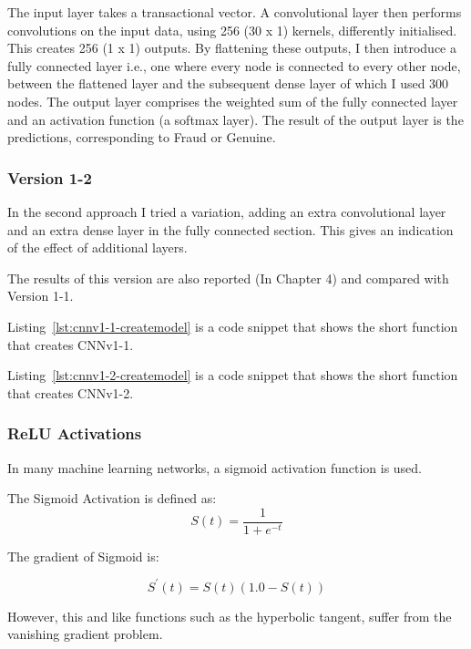\documentclass[12pt,a4paper,twoside]{report}
\begin{document}
The input layer takes a transactional vector. A convolutional layer then performs convolutions on the input data, using 256 (30 x 1) kernels, differently initialised. This creates 256 (1 x 1) outputs. By flattening these outputs, I then introduce a fully connected layer i.e., one where every node is connected to every other node, between the flattened layer and the subsequent dense layer of which I used 300 nodes. The output layer comprises the weighted sum of the fully connected layer and an activation function (a softmax layer). The result of the output layer is the predictions, corresponding to Fraud or Genuine.

\subsubsection{Version 1-2}
In the second approach I tried a variation, adding an extra convolutional layer and an extra dense layer in the fully connected section. This gives an indication of the effect of additional layers.

The results of this version are also reported (In Chapter 4) and compared with Version 1-1. 

Listing~\ref{lst:cnnv1-1-createmodel} is a code snippet that shows the short function that creates CNNv1-1. 



Listing~\ref{lst:cnnv1-2-createmodel} is a code snippet that shows the short function that creates CNNv1-2. 





\subsubsection{ReLU Activations}

In many machine learning networks, a sigmoid activation function is used. 

The Sigmoid Activation is defined as:
$$S ( t ) = \frac { 1} { 1+ e ^ { - t } }$$

The gradient of Sigmoid is:

$$S ^ { \prime } ( t ) = S ( t ) ( 1.0- S ( t ) )$$

However, this and like functions such as the hyperbolic tangent, suffer from the vanishing gradient problem.
\end{document}
